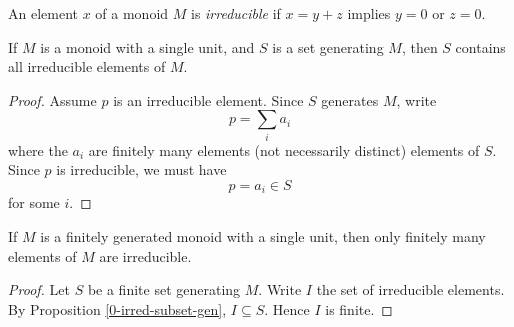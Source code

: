 \begin{definition}
  \label{0-irred}
  \uses{}
  \leanok

  An element $x$ of a monoid $M$ is \emph{irreducible} if $x = y + z$ implies $y = 0$ or $z = 0$.
\end{definition}


\begin{proposition}
  \label{0-irred-subset-gen}
  \leanok

  If $M$ is a monoid with a single unit, and $S$ is a set generating $M$, then $S$ contains all irreducible elements of $M$.
\end{proposition}
\begin{proof}
  \uses{}

  Assume $p$ is an irreducible element. Since $S$ generates $M$, write
  \[
    p = \sum_i a_i
  \]
  where the $a_i$ are finitely many elements (not necessarily distinct) elements of $S$. Since $p$ is irreducible, we must have
  \[
    p = a_i \in S
  \]
  for some $i$.
\end{proof}


\begin{proposition}
  \label{0-irred-finite}
  \leanok

  If $M$ is a finitely generated monoid with a single unit, then only finitely many elements of $M$ are irreducible.
\end{proposition}
\begin{proof}
  \leanok

  Let $S$ be a finite set generating $M$. Write $I$ the set of irreducible elements. By Proposition \ref{0-irred-subset-gen}, $I \subseteq S$. Hence $I$ is finite.
\end{proof}


